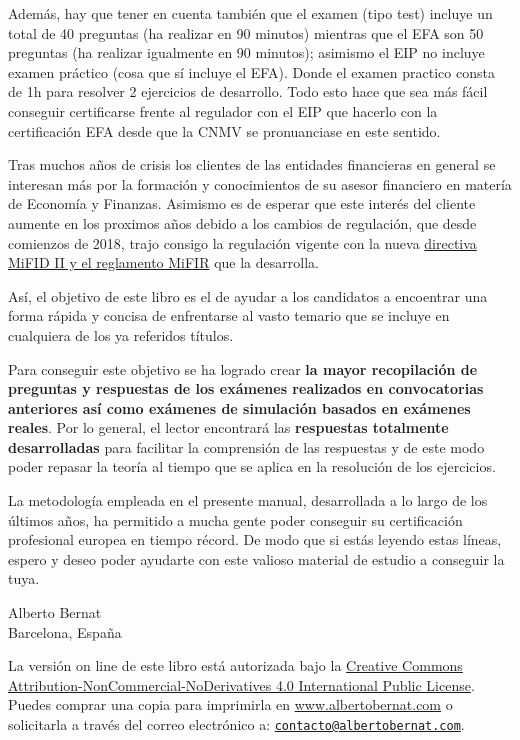 \documentclass[
  letterpaper,
  DIV=11,
  numbers=noendperiod]{scrreprt}
\begin{document}
Además, hay que tener en cuenta también que el examen (tipo test)
incluye un total de 40 preguntas (ha realizar en 90 minutos) mientras
que el EFA son 50 preguntas (ha realizar igualmente en 90 minutos);
asimismo el EIP no incluye examen práctico (cosa que sí incluye el EFA).
Donde el examen practico consta de 1h para resolver 2 ejercicios de
desarrollo. Todo esto hace que sea más fácil conseguir certificarse
frente al regulador con el EIP que hacerlo con la certificación EFA
desde que la CNMV se pronuanciase en este sentido.

Tras muchos años de crisis los clientes de las entidades financieras en
general se interesan más por la formación y conocimientos de su asesor
financiero en matería de Economía y Finanzas. Asimismo es de esperar que
este interés del cliente aumente en los proximos años debido a los
cambios de regulación, que desde comienzos de 2018, trajo consigo la
regulación vigente con la nueva
\href{http://cnmv.es/portal/MIFIDII_MIFIR/MapaMiFID.aspx}{directiva
MiFID II y el reglamento MiFIR} que la desarrolla.

Así, el objetivo de este libro es el de ayudar a los candidatos a
encoentrar una forma rápida y concisa de enfrentarse al vasto temario
que se incluye en cualquiera de los ya referidos títulos.

Para conseguir este objetivo se ha logrado crear \textbf{la mayor
recopilación de preguntas y respuestas de los exámenes realizados en
convocatorias anteriores así como exámenes de simulación basados en
exámenes reales}. Por lo general, el lector encontrará las
\textbf{respuestas totalmente desarrolladas} para facilitar la
comprensión de las respuestas y de este modo poder repasar la teoría al
tiempo que se aplica en la resolución de los ejercicios.

La metodología empleada en el presente manual, desarrollada a lo largo
de los últimos años, ha permitido a mucha gente poder conseguir su
certificación profesional europea en tiempo récord. De modo que si estás
leyendo estas líneas, espero y deseo poder ayudarte con este valioso
material de estudio a conseguir la tuya.


Alberto Bernat\\
Barcelona, España 

La versión on line de este libro está autorizada bajo la
\href{https://creativecommons.org/licenses/by-nc-nd/4.0/legalcode}{Creative
Commons Attribution-NonCommercial-NoDerivatives 4.0 International Public
License}. Puedes comprar una copia para imprimirla en
\href{https://sowl.co/yUAeV}{www.albertobernat.com} o solicitarla a
través del correo electrónico a:
\href{mailto:contacto@albertobernat.com}{\nolinkurl{contacto@albertobernat.com}}.
\end{document}
